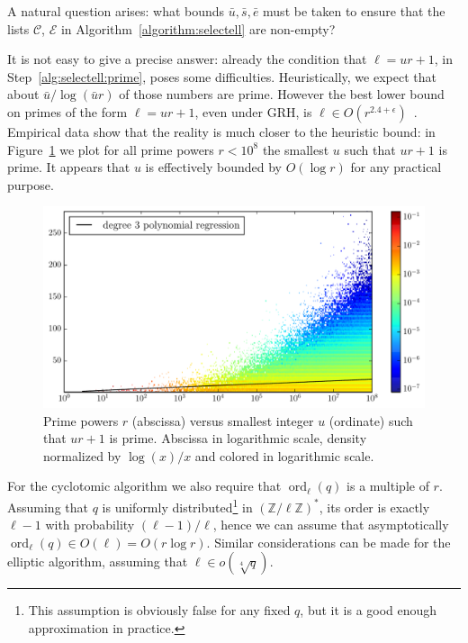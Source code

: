 \documentclass[12pt]{article}
\theoremstyle{plain}
\theoremstyle{definition}
\DeclareMathOperator{\order}{ord} %
\def\Z{\ensuremath{\mathbb{Z}}}
\newcounter{algorithm}
\begin{document}
A natural question arises: what bounds $\bar{u},\bar{s},\bar{e}$ must
be taken to ensure that the lists $\mathcal{C}$, $\mathcal{E}$ in
Algorithm~\ref{algorithm:selectell} are non-empty?

It is not easy to give a precise answer: already the condition that
$\ell=ur+1$, in Step~\ref{alg:selectell:prime}, poses some
difficulties. Heuristically, we expect that about
$\bar{u}/\log(\bar{u}r)$ of those numbers are prime. However the best
lower bound on primes of the form $\ell=ur+1$, even under GRH, is
$\ell\in O(r^{2.4+\epsilon})$~\cite{heath1992zero}. Empirical data
show that the reality is much closer to the heuristic bound: in
Figure~\ref{fig:primes-arith-prog} we plot for all prime powers
$r<10^8$ the smallest $u$ such that $ur+1$ is prime. It appears that
$u$ is effectively bounded by $O(\log r)$ for any practical purpose.


\begin{figure}
  \centering
  \includegraphics[width=\textwidth]{plots/arith_prog}
  \caption{Prime powers $r$ (abscissa) versus smallest integer $u$
    (ordinate) such that $ur+1$ is prime. Abscissa in logarithmic
    scale, density normalized by $\log(x)/x$ and colored in
    logarithmic scale.}
  \label{fig:primes-arith-prog}
\end{figure}

For the cyclotomic algorithm we also require that $\order_\ell(q)$ is
a multiple of $r$. Assuming that $q$ is uniformly
distributed\footnote{This assumption is obviously false for any fixed
  $q$, but it is a good enough approximation in practice.} in
$(\Z/\ell\Z)^\ast$, its order is exactly $\ell-1$ with probability
$(\ell-1)/\ell$, hence we can assume that asymptotically
$\order_\ell(q)\in O(\ell)=O(r\log r)$. Similar considerations can be
made for the elliptic algorithm, assuming that $\ell\in
o(\sqrt[4]{q})$.
\end{document}
